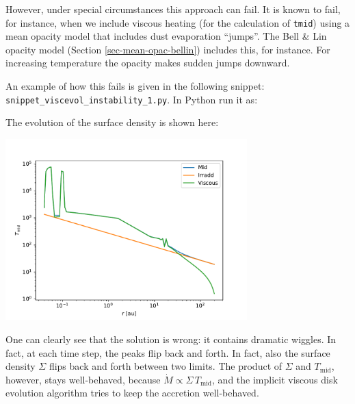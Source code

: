 \documentclass{book}
\newcommand{\code}[1]{{\small\tt #1}}
\begin{document}
However, under special circumstances this approach can fail. It is known to
fail, for instance, when we include viscous heating (for the calculation of
\code{tmid}) using a mean opacity model that includes dust evaporation
``jumps''. The Bell \& Lin opacity model (Section \ref{sec-mean-opac-bellin})
includes this, for instance. For increasing temperature the opacity makes
sudden jumps downward. 

An example of how this fails is given in the following snippet:
\code{snippet\_viscevol\_instability\_1.py}. In Python run it as:
\begin{codebox}
\end{codebox}
The evolution of the surface density is shown
here:\\ \centerline{\includegraphics[width=0.7\textwidth]{../snippets/fig_snippet_viscevol_instability_1_1.pdf}}
One can clearly see that the solution is wrong: it contains dramatic wiggles.
In fact, at each time step, the peaks flip back and forth. In fact, also the
surface density $\Sigma$ flips back and forth between two limits.  The product
of $\Sigma$ and $T_{\mathrm{mid}}$, however, stays well-behaved, because $\dot
M\propto \Sigma\,T_{\mathrm{mid}}$, and the implicit viscous disk evolution
algorithm tries to keep the accretion well-behaved.
\end{document}
